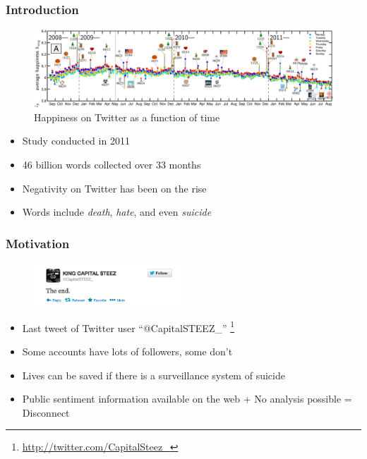 \documentclass{beamer}
\begin{document}
    \begin{frame}
        \frametitle{Introduction}
        \begin{figure}
            \centering
            \includegraphics[width=\textwidth]{figures/twitter_happiness.png}
            \caption{Happiness on Twitter as a function of time}
        \end{figure}
        \begin{itemize}
            \item{Study conducted in 2011}
            \item{46 billion words collected over 33 months}
            \item{Negativity on Twitter has been on the rise}
            \item{Words include \emph{death}, \emph{hate}, and even \emph{suicide}}
        \end{itemize}
    \end{frame}
    
    \begin{frame}
        \frametitle{Motivation}
        \begin{figure}
            \centering
            \includegraphics[width=0.5\textwidth]{figures/twitter_kcs.png}
        \end{figure}
        \begin{itemize}
            \item{Last tweet of Twitter user ``@CapitalSTEEZ\_'' \footnote{\url{http://twitter.com/CapitalSteez\_}}}
            \item{Some accounts have lots of followers, some don't}
            \item{Lives can be saved if there is a surveillance system of suicide}
            \item{Public sentiment information available on the web + No analysis possible = Disconnect}
        \end{itemize}
    \end{frame}
    
\end{document}
